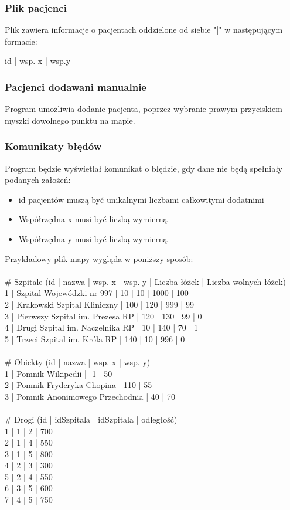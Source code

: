 \documentclass{article}
\begin{document}
\subsubsection{Plik pacjenci}
Plik zawiera informacje o pacjentach oddzielone od siebie "|"  w następującym formacie:

id | wsp. x | wsp.y 

\subsubsection{Pacjenci dodawani manualnie}
Program umożliwia dodanie pacjenta, poprzez wybranie prawym przyciskiem myszki dowolnego punktu na mapie.

\subsubsection{Komunikaty błędów}
Program będzie wyświetlał komunikat o błędzie, gdy dane nie będą spełniały podanych założeń:

\begin{itemize}
\item id pacjentów muszą być unikalnymi liczbami całkowitymi dodatnimi
\item Współrzędna x musi być liczbą wymierną
\item Współrzędna y musi być liczbą wymierną
\end{itemize}



Przykładowy plik mapy wygląda w poniższy
sposób:\\
\\
\# Szpitale (id | nazwa | wsp. x | wsp. y | Liczba łóżek | Liczba wolnych łóżek)\\
1 | Szpital Wojewódzki nr 997 | 10 | 10 | 1000 | 100\\
2 | Krakowski Szpital Kliniczny | 100 | 120 | 999 | 99\\
3 | Pierwszy Szpital im. Prezesa RP | 120 | 130 | 99 | 0\\
4 | Drugi Szpital im. Naczelnika RP | 10 | 140 | 70 | 1\\
5 | Trzeci Szpital im. Króla RP | 140 | 10 | 996 | 0\\
\\
\# Obiekty (id | nazwa | wsp. x | wsp. y)\\
1 | Pomnik Wikipedii | -1 | 50\\
2 | Pomnik Fryderyka Chopina | 110 | 55\\
3 | Pomnik Anonimowego Przechodnia | 40 | 70\\
\\
\# Drogi (id | idSzpitala | idSzpitala | odległość)\\
1 | 1 | 2 | 700\\
2 | 1 | 4 | 550\\
3 | 1 | 5 | 800\\
4 | 2 | 3 | 300\\
5 | 2 | 4 | 550\\
6 | 3 | 5 | 600\\
7 | 4 | 5 | 750\\
\end{document}
